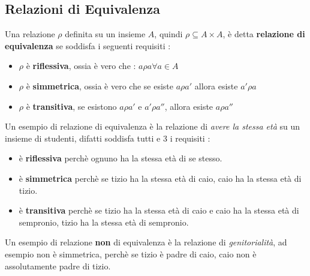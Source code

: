 \documentclass[12pt, letterpaper]{article}
\begin{document}
\subsection{Relazioni di Equivalenza}
Una relazione \(\rho\) definita su un insieme \(A\), quindi \(\rho \subseteq A \times A\), è detta \textbf{relazione 
di equivalenza} se soddisfa i seguenti requisiti : 
\begin{itemize}
    \item \(\rho\) è \textbf{riflessiva}, ossia è vero che :  \(a\rho a \forall a \in A\)
    \item \(\rho\) è \textbf{simmetrica}, ossia è vero che se esiste \(a\rho a'\) allora esiste \(a'\rho a\)
    \item \(\rho\) è \textbf{transitiva}, se esistono \(a\rho a'\) e \(a'\rho a''\), allora esiste \(a\rho a''\)
\end{itemize}
Un esempio di relazione di equivalenza è la relazione di \textit{avere la stessa età} su un 
insieme di studenti, difatti soddisfa tutti e 3 i requisiti : 
\begin{itemize}
    \item è \textbf{riflessiva} perchè ognuno ha la stessa età di se stesso.
    \item è \textbf{simmetrica} perchè se tizio ha la stessa età di caio, caio ha la stessa età di tizio.
    \item è \textbf{transitiva} perchè se tizio ha la stessa età di caio e caio ha la stessa età di sempronio, tizio ha la stessa età di sempronio.
\end{itemize}\newpage
Un esempio di relazione \textbf{non} di equivalenza è la relazione di \textit{genitorialità}, ad esempio non è simmetrica, perchè se 
tizio è padre di caio, caio non è assolutamente padre di tizio.
\end{document}

